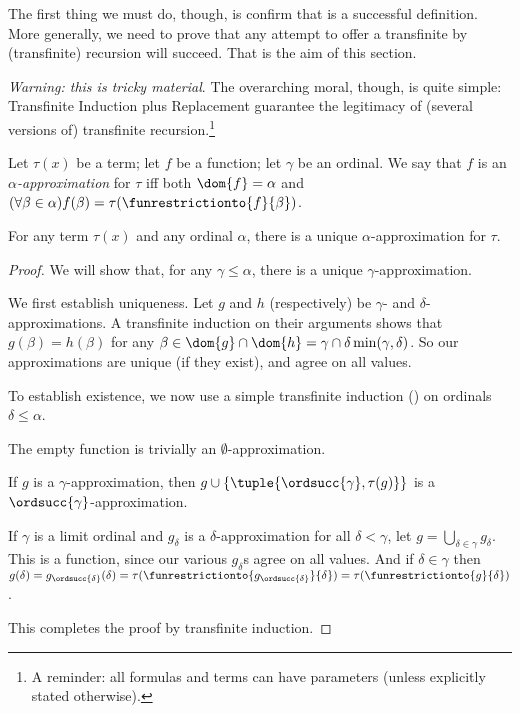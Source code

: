 \documentclass[../../../include/open-logic-section]{subfiles}
\begin{document}

The first thing we must do, though, is confirm that
 is a successful definition. More generally,
we need to prove that any attempt to offer a transfinite by
(transfinite) recursion will succeed. That is the aim of this section.

\emph{Warning: this is tricky material}. The overarching moral,
though, is quite simple: Transfinite Induction plus Replacement
guarantee the legitimacy of (several versions of) transfinite
recursion.\footnote{A reminder: all formulas and terms can have parameters (unless explicitly stated otherwise).}

\begin{defn}
	Let $\tau(x)$ be a term; let $f$ be a function; let $\gamma$ be an ordinal. We say that $f$ is an \emph{$\alpha$-approximation} for $\tau$ iff both $\dom{f} = \alpha$ and $(\forall \beta \in \alpha)f(\beta) = \tau(\funrestrictionto{f}{\beta})$.
\end{defn}

\begin{lem}
For any term $\tau(x)$ and any ordinal $\alpha$, there is a unique $\alpha$-approximation for $\tau$.
\end{lem}
\begin{proof}
We will show that, for any $\gamma \leq \alpha$, there is a unique
$\gamma$-approximation. 

We first establish uniqueness. Let $g$ and $h$ (respectively) be $\gamma$- and $\delta$-approximations. A transfinite induction on their arguments shows that
$g(\beta) = h(\beta)$ for any $\beta \in \dom{g} \cap \dom{h} =
\gamma \cap \delta \min(\gamma, \delta)$. So our approximations are unique (if they exist), and agree on all values.

To establish existence, we now use a simple transfinite induction
() on ordinals
$\delta \leq \alpha$. 

The empty function is trivially an $\emptyset$-approximation. 

If $g$ is a $\gamma$-approximation, then $g \cup
\{\tuple{\ordsucc{\gamma}, \tau(g)}\}$ is a $\ordsucc{\gamma}$-approximation.

If $\gamma$ is a limit ordinal and $g_\delta$ is a $\delta$-approximation for all $\delta < \gamma$, let $g = \bigcup_{\delta \in \gamma} g_\delta$. This
is a function, since our various $g_\delta$s agree on all values. And
if $\delta \in \gamma$ then $g(\delta) = g_{\ordsucc{\delta}}(\delta) =
\tau(\funrestrictionto{g_{\ordsucc{\delta}}}{\delta}) =
\tau(\funrestrictionto{g}{\delta})$.

This completes the proof by transfinite induction.
\end{proof}
\end{document}
